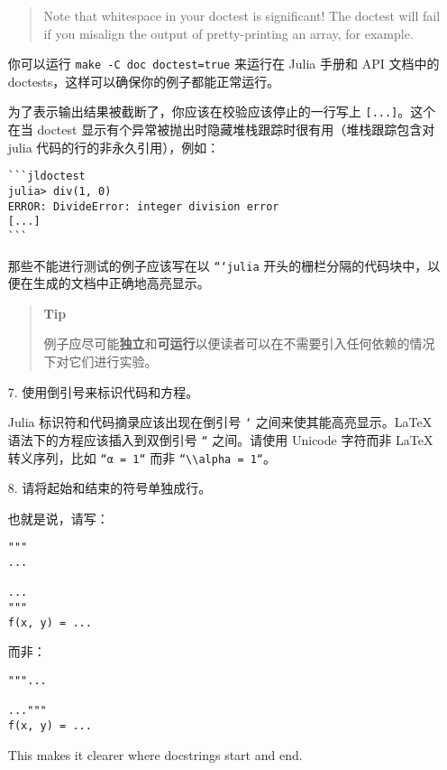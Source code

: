 \begin{itemize}
\begin{quote}
Note that whitespace in your doctest is significant! The doctest will fail if you misalign the output of pretty-printing an array, for example.

\end{quote}
你可以运行 \texttt{make -C doc doctest=true} 来运行在 Julia 手册和 API 文档中的 doctests，这样可以确保你的例子都能正常运行。

为了表示输出结果被截断了，你应该在校验应该停止的一行写上 \texttt{[...]}。这个在当 doctest 显示有个异常被抛出时隐藏堆栈跟踪时很有用（堆栈跟踪包含对 julia 代码的行的非永久引用），例如：


\begin{verbatim}
```jldoctest
julia> div(1, 0)
ERROR: DivideError: integer division error
[...]
```
\end{verbatim}

那些不能进行测试的例子应该写在以 \texttt{```julia} 开头的栅栏分隔的代码块中，以便在生成的文档中正确地高亮显示。

\begin{quote}
\textbf{Tip}

例子应尽可能\textbf{独立}和\textbf{可运行}以便读者可以在不需要引入任何依赖的情况下对它们进行实验。

\end{quote}

\item[7.  ] 使用倒引号来标识代码和方程。

Julia 标识符和代码摘录应该出现在倒引号 \texttt{`} 之间来使其能高亮显示。LaTeX 语法下的方程应该插入到双倒引号 \texttt{``} 之间。请使用 Unicode 字符而非 LaTeX 转义序列，比如 \texttt{``α = 1``} 而非 \texttt{``{\textbackslash}{\textbackslash}alpha = 1``}。


\item[8.  ] 请将起始和结束的\texttt{{\textquotedbl}{\textquotedbl}{\textquotedbl}}符号单独成行。

也就是说，请写：


\begin{verbatim}
"""
...

...
"""
f(x, y) = ...
\end{verbatim}

而非：


\begin{verbatim}
"""...

..."""
f(x, y) = ...
\end{verbatim}

This makes it clearer where docstrings start and end.



\end{itemize}
